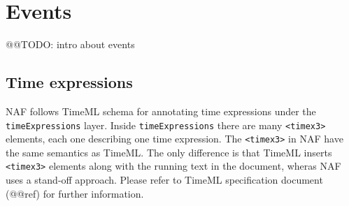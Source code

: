 
\section{Events}
\label{sec:events}

@@TODO: intro about events\\

\subsection{Time expressions}
\label{sec:time-expressions}

NAF follows TimeML schema for annotating time expressions under the
\texttt{timeExpressions} layer. Inside \texttt{timeExpressions} there are
many \texttt{<timex3>} elements, each one describing one time
expression. The \texttt{<timex3>} in NAF have the same semantics as
TimeML. The only difference is that TimeML inserts \texttt{<timex3>}
elements along with the running text in the document, wheras NAF uses a
stand-off approach. Please refer to TimeML specification document (@@ref)
for further information.

